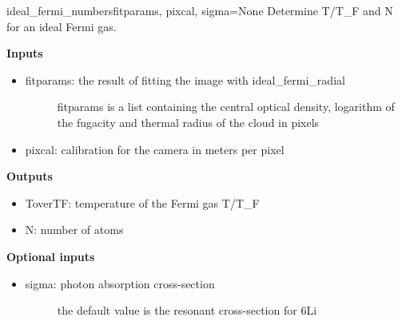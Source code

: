 \documentclass[letterpaper,10pt,english]{manual}
\begin{document}
\hypertarget{fitfuncs.ideal_fermi_numbers}{}\begin{funcdesc}{ideal\_fermi\_numbers}{fitparams, pixcal, sigma=None}
Determine T/T\_F and N for an ideal Fermi gas.

\textbf{Inputs}
\begin{itemize}
\item {} \begin{description}
\item[fitparams: the result of fitting the image with ideal\_fermi\_radial]
fitparams is a list containing the central optical density,
logarithm of the fugacity and thermal radius of the cloud in
pixels

\end{description}

\item {} 
pixcal: calibration for the camera in meters per pixel

\end{itemize}

\textbf{Outputs}
\begin{itemize}
\item {} 
ToverTF: temperature of the Fermi gas T/T\_F

\item {} 
N: number of atoms

\end{itemize}

\textbf{Optional inputs}
\begin{itemize}
\item {} \begin{description}
\item[sigma: photon absorption cross-section]
the default value is the resonant cross-section for 6Li

\end{description}

\end{itemize}
\end{funcdesc}
\end{document}
